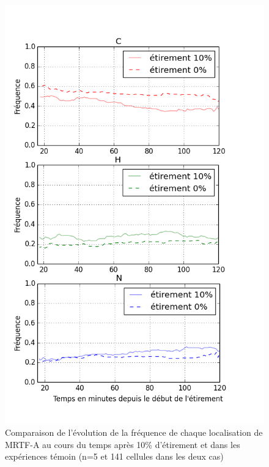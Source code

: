 \documentclass                                                                                                                                                                                                                                                                                                                                       {report}
\begin{document}
\begin{figure}[p]
\includegraphics[scale=0.4]{Figures/Etirement10_vs_0_dynamique.png} 
\caption{\label{CHN_dyn_Et10} Comparaison de l'évolution de la fréquence de chaque localisation de MRTF-A au cours du temps après 10\% d'étirement et dans les expériences témoin (n=5 et 141 cellules dans les deux cas)}
\end{figure}
\end{document}
